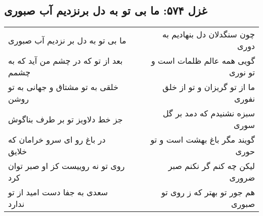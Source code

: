 \begin{center}
\section*{غزل ۵۷۴: ما بی تو به دل برنزدیم آب صبوری}
\label{sec:574}
\begin{longtable}{l p{0.5cm} r}
ما بی تو به دل بر نزدیم آب صبوری
&&
چون سنگدلان دل بنهادیم به دوری
\\
بعد از تو که در چشم من آید که به چشمم
&&
گویی همه عالم ظلمات است و تو نوری
\\
خلقی به تو مشتاق و جهانی به تو روشن
&&
ما از تو گریزان و تو از خلق نفوری
\\
جز خط دلاویز تو بر طرف بناگوش
&&
سبزه نشنیدم که دمد بر گل سوری
\\
در باغ رو ای سرو خرامان که خلایق
&&
گویند مگر باغ بهشت است و تو حوری
\\
روی تو نه روییست کز او صبر توان کرد
&&
لیکن چه کنم گر نکنم صبر ضروری
\\
سعدی به جفا دست امید از تو ندارد
&&
هم جور تو بهتر که ز روی تو صبوری
\\
\end{longtable}
\end{center}
